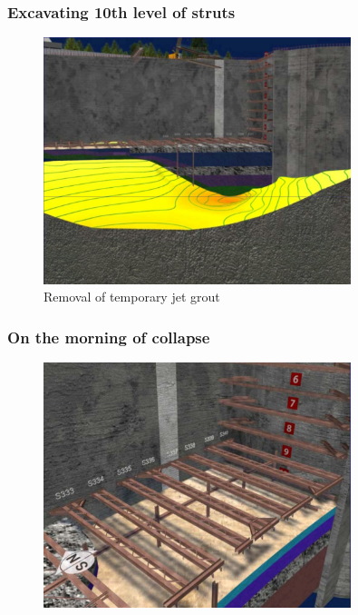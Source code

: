 \documentclass[notes]{beamer}
\begin{document}
\begin{frame}
\frametitle{Excavating 10th level of struts}
\begin{figure}[ht]
	\centering
	\includegraphics[width=0.8\textwidth]{figs/excavation-10-struts-jgp.png}
	\caption*{Removal of temporary jet grout}
\end{figure}
\end{frame}

\begin{frame}
\frametitle{On the morning of collapse}
\begin{figure}[ht]
	\centering
	\includegraphics[width=0.8\textwidth]{figs/observation-morning-collapse.png}
\end{figure}
\end{frame}
\end{document}
